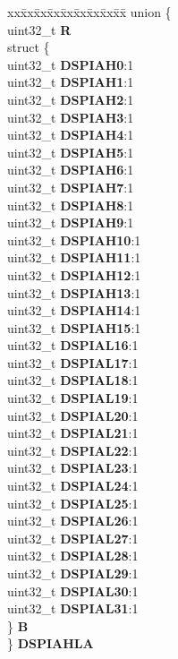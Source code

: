 \begin{DoxyCompactItemize}
\begin{tabbing}
\end{tabbing}\item 
\mbox{\label{structSIU__tag_aa06ea4b236fef207dc0bf75657a34e06}} 
\begin{tabbing}
xx\=xx\=xx\=xx\=xx\=xx\=xx\=xx\=xx\=\kill
union \{\\
\>uint32\_t {\bfseries R}\\
\>struct \{\\
\>\>uint32\_t {\bfseries DSPIAH0}:1\\
\>\>uint32\_t {\bfseries DSPIAH1}:1\\
\>\>uint32\_t {\bfseries DSPIAH2}:1\\
\>\>uint32\_t {\bfseries DSPIAH3}:1\\
\>\>uint32\_t {\bfseries DSPIAH4}:1\\
\>\>uint32\_t {\bfseries DSPIAH5}:1\\
\>\>uint32\_t {\bfseries DSPIAH6}:1\\
\>\>uint32\_t {\bfseries DSPIAH7}:1\\
\>\>uint32\_t {\bfseries DSPIAH8}:1\\
\>\>uint32\_t {\bfseries DSPIAH9}:1\\
\>\>uint32\_t {\bfseries DSPIAH10}:1\\
\>\>uint32\_t {\bfseries DSPIAH11}:1\\
\>\>uint32\_t {\bfseries DSPIAH12}:1\\
\>\>uint32\_t {\bfseries DSPIAH13}:1\\
\>\>uint32\_t {\bfseries DSPIAH14}:1\\
\>\>uint32\_t {\bfseries DSPIAH15}:1\\
\>\>uint32\_t {\bfseries DSPIAL16}:1\\
\>\>uint32\_t {\bfseries DSPIAL17}:1\\
\>\>uint32\_t {\bfseries DSPIAL18}:1\\
\>\>uint32\_t {\bfseries DSPIAL19}:1\\
\>\>uint32\_t {\bfseries DSPIAL20}:1\\
\>\>uint32\_t {\bfseries DSPIAL21}:1\\
\>\>uint32\_t {\bfseries DSPIAL22}:1\\
\>\>uint32\_t {\bfseries DSPIAL23}:1\\
\>\>uint32\_t {\bfseries DSPIAL24}:1\\
\>\>uint32\_t {\bfseries DSPIAL25}:1\\
\>\>uint32\_t {\bfseries DSPIAL26}:1\\
\>\>uint32\_t {\bfseries DSPIAL27}:1\\
\>\>uint32\_t {\bfseries DSPIAL28}:1\\
\>\>uint32\_t {\bfseries DSPIAL29}:1\\
\>\>uint32\_t {\bfseries DSPIAL30}:1\\
\>\>uint32\_t {\bfseries DSPIAL31}:1\\
\>\} {\bfseries B}\\
\} {\bfseries DSPIAHLA}\\


\end{tabbing}
\end{DoxyCompactItemize}
